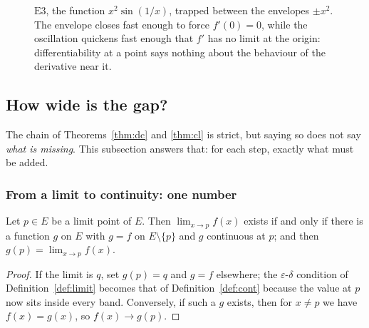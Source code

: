 \begin{figure}[htbp]
\centering
{}
\caption{$\mathrm{E}3$, the function $x^2\sin(1/x)$, trapped between the
envelopes $\pm x^2$. The envelope closes fast enough to force $f'(0)=0$,
while the oscillation quickens fast enough that $f'$ has no limit at the
origin: differentiability at a point says nothing about the behaviour of the
derivative near it.}
\label{fig:xsq}
\end{figure}

\subsection{How wide is the gap?}
\label{sec:gap}

The chain of Theorems~\ref{thm:dc} and \ref{thm:cl} is strict, but saying so
does not say \emph{what is missing}. This subsection answers that: for each
step, exactly what must be added.

\subsubsection*{From a limit to continuity: one number}

\begin{proposition}\label{prop:gap1}
Let $p \in E$ be a limit point of $E$. Then $\lim_{x\to p}f(x)$ exists if and
only if there is a function $g$ on $E$ with $g = f$ on $E\setminus\{p\}$ and
$g$ continuous at $p$; and then $g(p) = \lim_{x\to p}f(x)$.
\end{proposition}

\begin{proof}
If the limit is $q$, set $g(p)=q$ and $g=f$ elsewhere; the
$\varepsilon$-$\delta$ condition of Definition~\ref{def:limit} becomes that
of Definition~\ref{def:cont} because the value at $p$ now sits inside every
band. Conversely, if such a $g$ exists, then for $x \ne p$ we have
$f(x)=g(x)$, so $f(x) \to g(p)$.
\end{proof}

